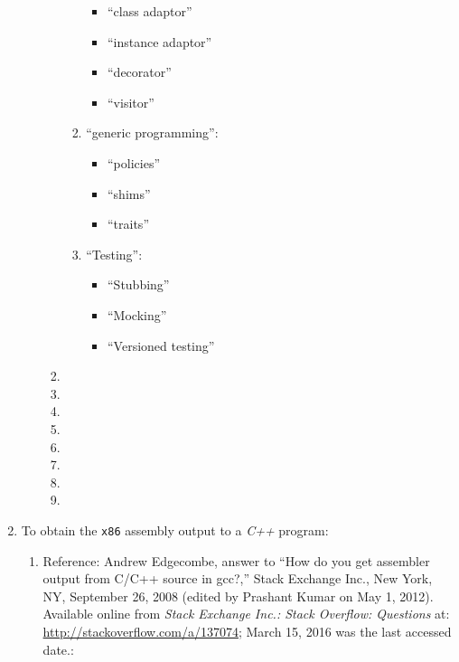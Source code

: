 \begin{enumerate}
\begin{enumerate}
\begin{enumerate}
\begin{enumerate}
				\begin{itemize} \itemsep -1pt
				\item ``class adaptor''
				\item ``instance adaptor''
				\item ``decorator''
				\item ``visitor''
				\end{itemize}
			\item ``generic programming'': \vspace{-0.1cm}
				\begin{itemize} \itemsep -1pt
				\item ``policies''
				\item ``shims''
				\item ``traits''
				\end{itemize}
			\item ``Testing'': \vspace{-0.1cm}
				\begin{itemize} \itemsep -1pt
				\item ``Stubbing''
				\item ``Mocking''
				\item ``Versioned testing''
				\end{itemize}
			\end{enumerate}
		\item 
		\item 
		\item 
		\item 
		\item 
		\item 
		\item 
		\item 
		\end{enumerate}
	\end{enumerate}
\item To obtain the {\tt x86} assembly output to a {\it C++} program: \vspace{-0.3cm}
	\begin{enumerate} \itemsep -2pt
	\item Reference: Andrew Edgecombe, answer to ``How do you get assembler output from C/C++ source in gcc?,'' Stack Exchange Inc., New York, NY, September 26, 2008 (edited by Prashant Kumar on May 1, 2012). Available online from {\it Stack Exchange Inc.: Stack Overflow: Questions} at: \url{http://stackoverflow.com/a/137074}; March 15, 2016 was the last accessed date.: \vspace{-0.2cm}
		\begin{enumerate} \itemsep -2pt

\end{enumerate}
\end{enumerate}
\end{enumerate}
